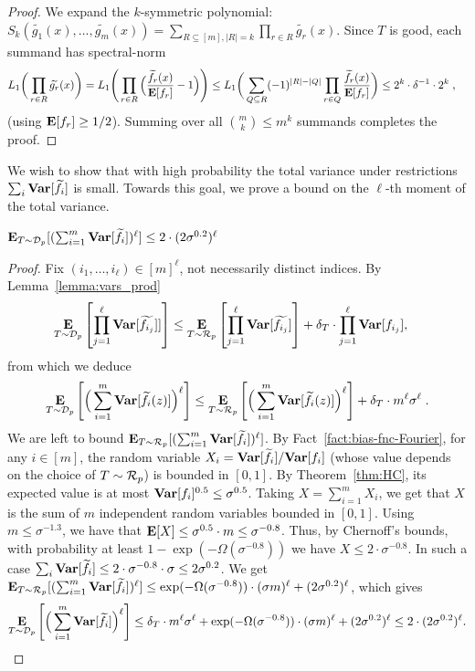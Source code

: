 \begin{proof}
We expand the $k$-symmetric polynomial:
$S_{k}(\tilde{g_1}(x),\ldots, \tilde{g_m}(x)) = \sum_{R \subseteq [m], |R|=k} \prod_{r\in R} \widetilde{g_r}(x)$.
Since $T$ is good, each summand has spectral-norm
\begin{align*} 
L_1\bigg(\prod_{r\in R}  \widetilde{g_r}(x)\bigg)
&=L_1\Bigg(\prod_{r\in R}  \Big(\frac{\widetilde{f_r}(x)}{\mathop{\bf E\/}[f_r]} -1\Big)\Bigg) 
\le L_1\bigg(\sum_{Q \subseteq R}  (-1)^{|R|-|Q|} \prod_{r \in Q} \frac{\widetilde{f_r}(x)}{\mathop{\bf E\/}[f_r]}\bigg) 
\le 2^{k} \cdot \delta^{-1}\cdot 2^{k}\;,
\end{align*}
(using $\mathop{\bf E\/}[f_r] \ge 1/2$).
Summing over all $\binom{m}{k} \le m^k$ summands completes the proof.
\end{proof}

We wish to show that with high probability the total variance under restrictions $\sum_{i}{\mathop{\bf Var\/}}[\widetilde{f}_i]$ is small. Towards this goal, we prove a bound on the $\ell$-th moment of the total variance.
\begin{claim}\label{claim:Var_fi ell}
$
\mathop{\bf E\/}_{T\sim {\mathcal{D}}_p}[(\sum_{i=1}^m {\mathop{\bf Var\/}}[\widetilde{f}_i])^{\ell}] \le 
 2 \cdot (2\sigma^{0.2})^\ell
$
\end{claim}
\begin{proof}
Fix $(i_1, \ldots, i_{\ell})\in [m]^{\ell}$, not necessarily distinct indices. By Lemma~\ref{lemma:vars_prod}
\begin{align*}
	\mathop{\bf E\/}_{T\sim {\mathcal{D}}_p}\left[\prod_{j=1}^{\ell} \mathop{\bf Var\/}[\widetilde{f_{i_j}}]]\right] 
	&\le \mathop{\bf E\/}_{T\sim \mathcal{R}_p}\left[\prod_{j=1}^{\ell}\mathop{\bf Var\/}[\widetilde{f_{i_j}}]\right] 
	+ \delta_T \cdot\prod_{j=1}^{\ell} \mathop{\bf Var\/}[{f_{i_j}}],
\end{align*}
from which we deduce
$$
\mathop{\bf E\/}_{T\sim {\mathcal{D}}_p}\left[\Big(\sum_{i=1}^m {\mathop{\bf Var\/}}[\widetilde{f}_i(z)]\Big)^{\ell}\right] \le 
 \mathop{\bf E\/}_{T\sim \mathcal{R}_p}\left[\Big(\sum_{i=1}^m {\mathop{\bf Var\/}}[\widetilde{f}_i(z)]\Big)^{\ell}\right] + \delta_T \cdot m^{\ell} \sigma^{\ell} \;.
$$
We are left to bound $\mathop{\bf E\/}_{T\sim \mathcal{R}_p}[(\sum_{i=1}^m {\mathop{\bf Var\/}}[\widetilde{f}_i])^{\ell}]$. 
By Fact~\ref{fact:bias-fnc-Fourier}, for any $i\in[m]$, the random variable $X_i = \mathop{\bf Var\/}[\widetilde{f_i}]/{\mathop{\bf Var\/}}[f_i]$ (whose value depends on the choice of $T\sim \mathcal{R}_p$) is bounded in $[0,1]$.
By Theorem~\ref{thm:HC}, its expected value is at most $\mathop{\bf Var\/}[f_i]^{0.5} \le \sigma^{0.5}$.
Taking $X = \sum_{i=1}^{m}X_i$, we get that $X$ is the sum of $m$ independent random variables bounded in $[0,1]$.
Using $m \le \sigma^{-1.3}$, we have that $\mathop{\bf E\/}[X] \le \sigma^{0.5} \cdot m \le \sigma^{-0.8}$.
Thus, by Chernoff's bounds, with probability at least $1-\exp(-\Omega(\sigma^{-0.8}))$
we have
$X \le 2\cdot \sigma^{-0.8}$.
In such a case 
$\sum_{i} {\mathop{\bf Var\/}}[\widetilde{f_i}] 
\le 2 \cdot \sigma^{-0.8} \cdot \sigma 
\le 2\sigma^{0.2}$.
We get $\mathop{\bf E\/}_{T\sim \mathcal{R}_p}[(\sum_{i=1}^m {\mathop{\bf Var\/}}[\widetilde{f}_i])^{\ell}] \le \exp(-\Omega(\sigma^{-0.8}))\cdot (\sigma m)^{\ell} + 
(2\sigma^{0.2})^{\ell}$, which gives
\[\mathop{\bf E\/}_{T\sim {\mathcal{D}}_p}\left[\Big(\sum_{i=1}^m {\mathop{\bf Var\/}}[\widetilde{f}_i]\Big)^{\ell}\right]  \le 
\delta_T \cdot m^{\ell} \sigma^{\ell}  + \exp(-\Omega(\sigma^{-0.8}))\cdot (\sigma m)^{\ell} + 
(2\sigma^{0.2})^{\ell} \le 2\cdot (2 \sigma^{0.2})^{\ell}.\qedhere
\]
\end{proof}


